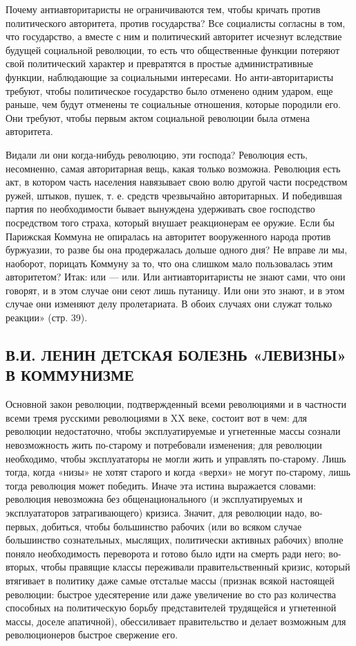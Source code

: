 \documentclass[12pt]{article}
\newcommand{\parnum}{(\arabic{parcount})}
\newcounter{parcount}
\newcommand\p{%
    \stepcounter{parcount}%
    \noindent\marginpar[]{\parnum}%
}
\newenvironment{parnumbers}{%
  \par%
  \everypar{\noindent \stepcounter{parcount}\marginpar[]{\parnum}}%
}{}
\begin{document}
\begin{parnumbers}
Почему антиавторитаристы не ограничиваются тем, чтобы кричать против политического авторитета, против государства? Все социалисты согласны в том, что государство, а вместе с ним и политический авторитет исчезнут вследствие будущей социальной революции, то есть что общественные функции потеряют свой политический характер и превратятся в простые административные функции, наблюдающие за социальными интересами. Но анти-авторитаристы требуют, чтобы политическое государство было отменено одним ударом, еще раньше, чем будут отменены те социальные отношения, которые породили его. Они требуют, чтобы первым актом социальной революции была отмена авторитета.

Видали ли они когда-нибудь революцию, эти господа? Революция есть, несомненно, самая авторитарная вещь, какая только возможна. Революция есть акт, в котором часть населения навязывает свою волю другой части посредством ружей, штыков, пушек, т. е. средств чрезвычайно авторитарных. И победившая партия по необходимости бывает вынуждена удерживать свое господство посредством того страха, который внушает реакционерам ее оружие. Если бы Парижская Коммуна не опиралась на авторитет вооруженного народа против буржуазии, то разве бы она продержалась дольше одного дня? Не вправе ли мы, наоборот, порицать Коммуну за то, что она слишком мало пользовалась этим авторитетом? Итак: или — или. Или антиавторитаристы не знают сами, что они говорят, и в этом случае они сеют лишь путаницу. Или они это знают, и в этом случае они изменяют делу пролетариата. В обоих случаях они служат только реакции» (стр. 39).
\end{parnumbers}

\subsection{В.И. ЛЕНИН ДЕТСКАЯ БОЛЕЗНЬ «ЛЕВИЗНЫ» В КОММУНИЗМЕ}

\p Основной закон революции, подтвержденный всеми революциями и в частности всеми тремя русскими революциями в XX веке, состоит вот в чем: для революции недостаточно, чтобы эксплуатируемые и угнетенные массы сознали невозможность жить по-старому и потребовали изменения; для революции необходимо, чтобы эксплуататоры не могли жить и управлять по-старому. Лишь тогда, когда «низы» не хотят старого и когда «верхи» не могут по-старому, лишь тогда революция может победить. Иначе эта истина выражается словами: революция невозможна без общенационального (и эксплуатируемых и эксплуататоров затрагивающего) кризиса. Значит, для революции надо, во-первых, добиться, чтобы большинство рабочих (или во всяком случае большинство сознательных, мыслящих, политически активных рабочих) вполне поняло необходимость переворота и готово было идти на смерть ради него; во-вторых, чтобы правящие классы переживали правительственный кризис, который втягивает в политику даже самые отсталые массы (признак всякой настоящей революции: быстрое удесятерение или даже увеличение во сто раз количества способных на политическую борьбу представителей трудящейся и угнетенной массы, доселе апатичной), обессиливает правительство и делает возможным для революционеров быстрое свержение его.
\end{document}
